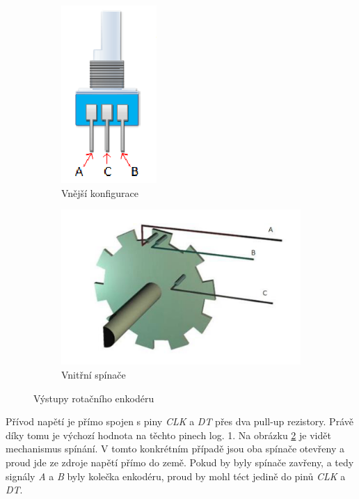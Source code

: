 \documentclass[a4paper, 11pt]{article}
\begin{document}
\begin{figure}[t]
    \centering
    
    \begin{subfigure}{0.4\textwidth}
        \centering
        \includegraphics[]{images/rotary_encoder_outputs.png}
        \caption{Vnější konfigurace}
        \label{img:rot_enc_config}
    \end{subfigure}
    \hspace{2em}
    \begin{subfigure}{0.4\textwidth}
        \centering
        \includegraphics[width=\linewidth]{images/rotary_encoder_switches.png}
        \caption{Vnitřní spínače}
        \label{img:rot_enc_switches}
    \end{subfigure}

    \caption{Výstupy rotačního enkodéru}
    \label{img:rot_enc_outputs}
\end{figure}

Přívod napětí je přímo spojen s piny \emph{CLK} a \emph{DT} přes dva pull-up rezistory. 
Právě díky tomu je výchozí hodnota na těchto pinech log. 1.
Na obrázku \ref{img:rot_enc_switches} je vidět mechanismus spínání.
V tomto konkrétním případě jsou oba spínače otevřeny a proud jde ze zdroje napětí přímo do země.
Pokud by byly spínače zavřeny, a tedy signály \emph{A} a \emph{B} byly  kolečka enkodéru, proud by mohl téct jedině do pinů \emph{CLK} a \emph{DT}.
\end{document}
